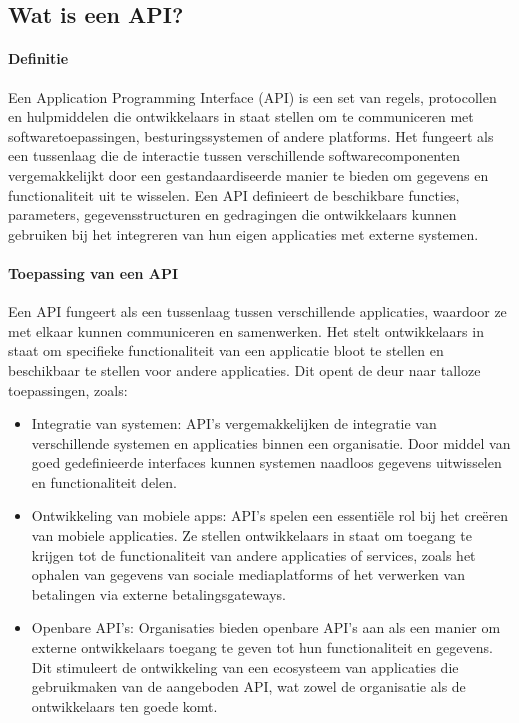 \subsection{Wat is een API?}%
\label{sec:Wat is een API?}
\paragraph{Definitie}
Een Application Programming Interface (API) is een set van regels, protocollen en hulpmiddelen die ontwikkelaars in staat stellen om te communiceren met softwaretoepassingen, besturingssystemen of andere platforms. Het fungeert als een tussenlaag die de interactie tussen verschillende softwarecomponenten vergemakkelijkt door een gestandaardiseerde manier te bieden om gegevens en functionaliteit uit te wisselen. Een API definieert de beschikbare functies, parameters, gegevensstructuren en gedragingen die ontwikkelaars kunnen gebruiken bij het integreren van hun eigen applicaties met externe systemen. \autocite{TransIP}
\\
\paragraph{Toepassing van een API}
Een API fungeert als een tussenlaag tussen verschillende applicaties, waardoor ze met elkaar kunnen communiceren en samenwerken. Het stelt ontwikkelaars in staat om specifieke functionaliteit van een applicatie bloot te stellen en beschikbaar te stellen voor andere applicaties. Dit opent de deur naar talloze toepassingen, zoals:
\begin{itemize}
    \item Integratie van systemen: API's vergemakkelijken de integratie van verschillende systemen en applicaties binnen een organisatie. Door middel van goed gedefinieerde interfaces kunnen systemen naadloos gegevens uitwisselen en functionaliteit delen.
    \item Ontwikkeling van mobiele apps: API's spelen een essentiële rol bij het creëren van mobiele applicaties. Ze stellen ontwikkelaars in staat om toegang te krijgen tot de functionaliteit van andere applicaties of services, zoals het ophalen van gegevens van sociale mediaplatforms of het verwerken van betalingen via externe betalingsgateways.
    \item Openbare API's: Organisaties bieden openbare API's aan als een manier om externe ontwikkelaars toegang te geven tot hun functionaliteit en gegevens. Dit stimuleert de ontwikkeling van een ecosysteem van applicaties die gebruikmaken van de aangeboden API, wat zowel de organisatie als de ontwikkelaars ten goede komt.
\end{itemize} \autocite{Schoemaker2019}
\\

